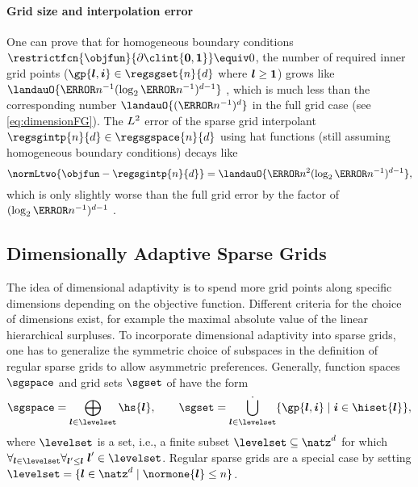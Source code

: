 \paragraph{Grid size and interpolation error}

One can prove that for homogeneous boundary conditions
$\restrictfcn{\objfun}{\bndrydomain{\clint{\*0,\*1}}} \equiv 0$,
the number of required inner grid points
($\gp{\*l,\*i} \in \regsgset{n}{d}$ where ${\boldsymbol{l}} \ge {\boldsymbol{1}}$)
grows like $\landauO{\ms{n}^{-1} (\log_2 \ms{n}^{-1})^{d-1}}$
, which is much less than
the corresponding number $\landauO{(\ms{n}^{-1})^d}$ in the full grid case
(see \eqref{eq:dimensionFG}).
The $L^2$ error of the sparse grid interpolant
$\regsgintp{n}{d} \in \regsgspace{n}{d}$ using hat functions
(still assuming homogeneous boundary conditions) decays like
\begin{equation}
  \normLtwo{\objfun - \regsgintp{n}{d}}
  = \landauO{\ms{n}^2 (\log_2 \ms{n}^{-1})^{d-1}},
\end{equation}
which is only slightly worse than the full grid error by the factor of
$(\log_2 \ms{n}^{-1})^{d-1}$
.



\subsection{Dimensionally Adaptive Sparse Grids}
\label{sec:232dimensionallyAdaptiveSG}

The idea of dimensional adaptivity is to spend more grid
points along specific dimensions depending on the objective function.
Different criteria for the choice of dimensions exist,
for example the maximal absolute value of the linear hierarchical surpluses.
To incorporate dimensional adaptivity into sparse grids,
one has to generalize the symmetric
choice of subspaces in the definition of regular sparse grids
to allow asymmetric preferences.
Generally, function spaces~$\sgspace$ and grid sets $\sgset$
of  have the form
\begin{equation}
  \label{eq:dimensionallyAdaptiveSG}
  \sgspace
  = \bigoplus_{\*l \in \levelset} \hs{\*l},\qquad
  \sgset
  = \bigdotcup_{\*l \in \levelset} \{\gp{\*l,\*i} \mid \*i \in \hiset{\*l}\},
\end{equation}
where $\levelset$ is a  set, i.e.,
a finite subset $\levelset \subset \natz^d$
for which $\fafa{\*l \in \levelset}{\*l' \le \*l}{\*l' \in \levelset}$.
Regular sparse grids are a special case by setting
$\levelset = \{\*l \in \natz^d \mid \normone{\*l} \le n\}$.

